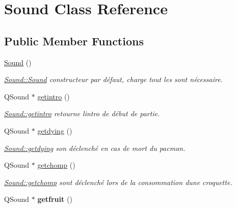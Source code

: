 \hypertarget{class_sound}{}\section{Sound Class Reference}
\label{class_sound}
\subsection*{Public Member Functions}
\begin{DoxyCompactItemize}
\item 
\hypertarget{class_sound_a539c205cdf06fe2c621fd77c37bcfac9}{}\hyperlink{class_sound_a539c205cdf06fe2c621fd77c37bcfac9}{Sound} ()\label{class_sound_a539c205cdf06fe2c621fd77c37bcfac9}

\begin{DoxyCompactList}\small\item\em \hyperlink{class_sound_a539c205cdf06fe2c621fd77c37bcfac9}{Sound\+::\+Sound} constructeur par défaut, charge tout les sont nécessaire. \end{DoxyCompactList}\item 
Q\+Sound $\ast$ \hyperlink{class_sound_ae853f6bbb1dfecbaad046a95e75a8312}{getintro} ()
\begin{DoxyCompactList}\small\item\em \hyperlink{class_sound_ae853f6bbb1dfecbaad046a95e75a8312}{Sound\+::getintro} retourne l\textquotesingle{}intro de début de partie. \end{DoxyCompactList}\item 
Q\+Sound $\ast$ \hyperlink{class_sound_a71028e73c1485b743a594bc7820405eb}{getdying} ()
\begin{DoxyCompactList}\small\item\em \hyperlink{class_sound_a71028e73c1485b743a594bc7820405eb}{Sound\+::getdying} son déclenché en cas de mort du pacman. \end{DoxyCompactList}\item 
Q\+Sound $\ast$ \hyperlink{class_sound_acf60752633e18e6d97ef231d17287781}{getchomp} ()
\begin{DoxyCompactList}\small\item\em \hyperlink{class_sound_acf60752633e18e6d97ef231d17287781}{Sound\+::getchomp} sont déclenché lors de la consommation d\textquotesingle{}une croquette. \end{DoxyCompactList}\item 
\hypertarget{class_sound_acd3f3e8f666c19c0b7ff8f760cc7c939}{}Q\+Sound $\ast$ {\bfseries getfruit} ()\label{class_sound_acd3f3e8f666c19c0b7ff8f760cc7c939}


\end{DoxyCompactItemize}
